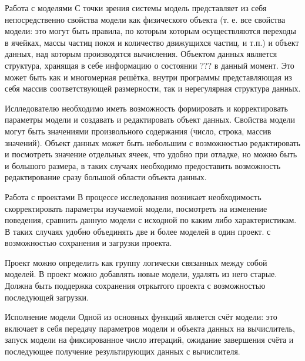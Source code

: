 \documentclass[a4paper,12pt]{extarticle}
\begin{document}
\begin{subsubsection}{Работа с моделями}
    С точки зрения системы модель представляет из себя непосредственно свойства модели как физического объекта (т. е. все свойства модели: это могут быть правила, по которым которым осуществляются переходы в ячейках, массы частиц покоя и количество движущихся частиц, и т.п.) и объект данных, над которым производятся вычисления. Объектом данных является структура, хранящая в себе информацию о состоянии ??? в данный момент. Это может быть как и многомерная решётка, внутри программы представляющая из себя массив соответствующей размерности, так и нерегулярная структура данных.
    
    Ислледователю необходимо иметь возможность формировать и корректировать параметры модели и создавать и редактировать объект данных. Свойства модели могут быть значениями произвольного содержания (число, строка, массив значений). Объект данных может быть небольшим с возможностью редактировать и посмотреть значение отдельных ячеек, что удобно при отладке, но можно быть и большого размера, в таких случаях необходимо предоставить возможность редактирование сразу большой области объекта данных.
\end{subsubsection}
    
\begin{subsubsection}{Работа с проектами}
    В процессе исследования возникает необходимость скорректировать параметры изучаемой модели, посмотреть на изменение поведения, сравнить данную модели с исходной по каким либо характеристикам. В таких случаях удобно объединять две и более моделей в один проект. с возможностью сохранения и загрузки проекта. 
    
    Проект можно определить как группу логически связанных между собой моделей. В проект можно добавлять новые модели, удалять из него старые. Должна быть поддержка сохранения отркытого проекта с возможностью последующей загрузки.
\end{subsubsection}
    
\begin{subsubsection}{Исполнение модели} 
    Одной из основных функций является счёт модели: это включает в себя передачу параметров модели и объекта данных на вычислитель, запуск модели на фиксированное число итераций, ожидание завершения счёта и последующее получение результирующих данных с вычислителя. 
\end{subsubsection}
    
\end{document}
